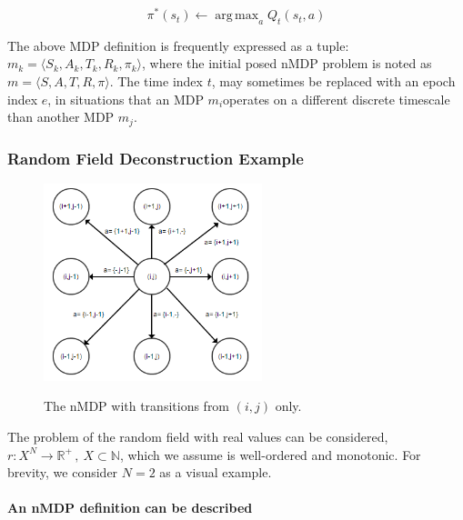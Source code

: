 \documentclass[compsoc,journal,letterpaper,10pt,draftcls,twocolumn]{IEEEtran}
\DeclareMathOperator*{\argmax}{arg\,max}
\begin{document}
\begin{equation}
\pi^{*}\left( s_{t} \right) \leftarrow \argmax_{a}{Q_{t}(s_{t},a)} 
\end{equation}

The above MDP definition is frequently expressed as a tuple:
\(m_{k} = \langle S_{k}, A_{k}, T_{k}, R_{k}, \pi_{k} \rangle\), where the initial posed
nMDP problem is noted as
\(m = \langle S, A, T, R,\pi \rangle \). The time index
\(t\), may sometimes be replaced with an epoch index \(e\), in
situations that an MDP \(m_{i}\)operates on a different discrete
timescale than another MDP \(m_{j}\).

\subsubsection{Random Field Deconstruction
Example}\label{random-field-deconstruction-example}

\begin{figure}[!t]
\centering
\includegraphics[width=2.5in]{media/image1.png}\\
\caption{\label{fig:figure1}The nMDP with transitions from \((i,j)\) only.}
\end{figure}


The
problem of the random field with real values can be considered,
\(r:X^{N} \rightarrow \mathbb{R}^{+}\,,\ X\mathbb{\subset N}\), which
we assume is well-ordered and monotonic. For brevity, we consider
\(N = 2\) as a visual example.

\paragraph{An nMDP definition can be
described}\label{an-nmdp-definition-can-be-described}
\end{document}
